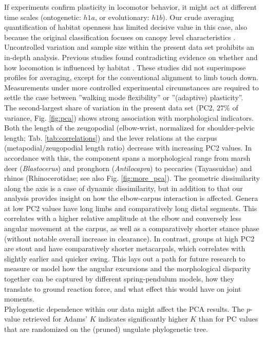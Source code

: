 \documentclass[10pt, a4paper]{article}
\begin{document}
\begin{linenumbers}[1]
If experiments confirm plasticity in locomotor behavior, it might act at different time scales (ontogenetic: $h1a$, or evolutionary: $h1b$).
Our crude averaging quantification of habitat openness has limited decisive value in this case, also because the original classification focuses on canopy level characteristics \citep{Stankowich2009}. 
Uncontrolled variation and sample size within the present data set prohibits an in-depth analysis. 
Previous studies found contradicting evidence on whether and how locomotion is influenced by habitat \citep[][]{Stoessel2012,Fuller2011,Arnold1983,Schulte2004,Druelle2019}. 
These studies did not superimpose profiles for averaging, except for the conventional alignment to limb touch down. 
Measurements under more controlled experimental circumstances are required to settle the case between ''walking mode flexibility'' or ''(adaptive) plasticity''. 
\medskip\\The second-largest share of variation in the present data set (PC2, $27\%$ of variance, Fig. \ref{fig:pca}) shows strong association with morphological indicators. 
Both the length of the zeugopodial (elbow-wrist, normalized for shoulder-pelvic length; Tab. \ref{tab:correlations}) and the lever relations at the carpus (metapodial/zeugopodial length ratio) decrease with increasing PC2 values. 
In accordance with this, the component spans a morphological range from marsh deer (\textit{Blastocerus}) and pronghorn (\textit{Antilocapra}) to peccaries (Tayassuidae) and rhinos (Rhinocerotidae; see also Fig. \ref{fig:more_pca}). 
The geometric dissimilarity along the axis is a case of dynamic dissimilarity, but in addition to that our analysis provides insight on how the elbow-carpus interaction is affected. 
Genera at low PC2 values have long limbs and comparatively long distal segments. 
This correlates with a higher relative amplitude at the elbow and conversely less angular movement at the carpus, as well as a comparatively shorter stance phase (without notable overall increase in clearance). 
In contrast, groups at high PC2 are stout and have comparatively shorter metacarpals, which correlates with slightly earlier and quicker swing. 
This lays out a path for future research to measure or model how the angular excursions and the morphological disparity together can be captured by different spring-pendulum models, how they translate to ground reaction force, and what effect this would have on joint moments. 
\\Phylogenetic dependence within our data might affect the PCA results. 
The $p$-value retrieved for Adams' $K$ indicates significantly higher $K$ than for PC values that are randomized on the (pruned) ungulate phylogenetic tree. 

\end{linenumbers}
\end{document}
